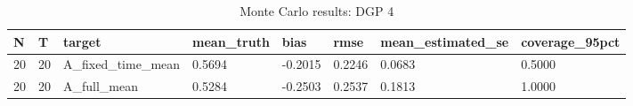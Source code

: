 \begin{table}[!htbp]
\centering
\caption{Monte Carlo results: DGP 4}
\label{tab:mc-dgp4}
\begin{tabular}{llllllll}
\toprule
N & T & target & mean\_truth & bias & rmse & mean\_estimated\_se & coverage\_95pct \\
\midrule
20 & 20 & A\_fixed\_time\_mean & 0.5694 & -0.2015 & 0.2246 & 0.0683 & 0.5000 \\
20 & 20 & A\_full\_mean & 0.5284 & -0.2503 & 0.2537 & 0.1813 & 1.0000 \\
\bottomrule
\end{tabular}
\end{table}
